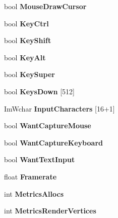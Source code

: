 \begin{DoxyCompactItemize}
bool {\bfseries Mouse\+Draw\+Cursor}
\item 
\mbox{\label{struct_im_gui_i_o_a51de8f65dcabb80ef4e0d3c759ffcd7f}} 
bool {\bfseries Key\+Ctrl}
\item 
\mbox{\label{struct_im_gui_i_o_a3c7642214f88862af5b8467f98ac35c9}} 
bool {\bfseries Key\+Shift}
\item 
\mbox{\label{struct_im_gui_i_o_a1e64ef08a4448a2cac874496130992cb}} 
bool {\bfseries Key\+Alt}
\item 
\mbox{\label{struct_im_gui_i_o_afda9e11e21b7ba21573671c38d9f4a81}} 
bool {\bfseries Key\+Super}
\item 
\mbox{\label{struct_im_gui_i_o_a182f42d74cb25a4cf611cc0f776b3848}} 
bool {\bfseries Keys\+Down} \mbox{[}512\mbox{]}
\item 
\mbox{\label{struct_im_gui_i_o_af6283418a2bff9db1522a6245476c7ed}} 
Im\+Wchar {\bfseries Input\+Characters} \mbox{[}16+1\mbox{]}
\item 
\mbox{\label{struct_im_gui_i_o_af5b8add76c5d833a65df19b5456acd7e}} 
bool {\bfseries Want\+Capture\+Mouse}
\item 
\mbox{\label{struct_im_gui_i_o_a458e4ca98d896adb16e3a41ec6d2b811}} 
bool {\bfseries Want\+Capture\+Keyboard}
\item 
\mbox{\label{struct_im_gui_i_o_a0e53197e96187a57b2d86720bf163f4d}} 
bool {\bfseries Want\+Text\+Input}
\item 
\mbox{\label{struct_im_gui_i_o_a8c6c2be54ddeda3cfb4a73cf95701a54}} 
float {\bfseries Framerate}
\item 
\mbox{\label{struct_im_gui_i_o_a9d17ce57fff7919f3ca1584c2186daaf}} 
int {\bfseries Metrics\+Allocs}
\item 
\mbox{\label{struct_im_gui_i_o_a8ec9d203f4543047a8820366c5734529}} 
int {\bfseries Metrics\+Render\+Vertices}

\end{DoxyCompactItemize}
